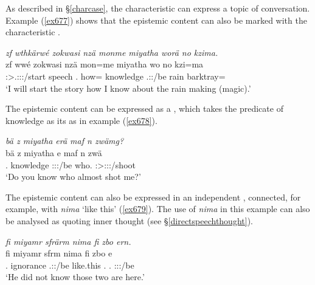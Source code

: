 As described in \S{}\ref{charcase}, the characteristic  can express a topic of conversation. Example (\ref{ex677}) shows that the epistemic content can also be marked with the characteristic .

\begin{exe}
	\ex \emph{zf wthkärwé zokwasi nzä monme miyatha worä no kzima.}\\
	\gll zf wwé zokwasi nzä mon=me miyatha wo no kzi=ma\\
	\Imm{} \Fsg:\Sbj>\Tsg.\F:\Obj:\Nonpast:\Ipfv/start speech \Fsg.\Abs{} how=\Ins{} knowledge \Fsg.\Sbj:\Nonpast:\Ipfv/be rain barktray=\Char{}\\
	\trans `I will start the story how I know about the rain making (magic).'\\
	\label{ex677}
\end{exe}

The epistemic content can be expressed as a , which takes the predicate of knowledge as its  as in example (\ref{ex678}).

\begin{exe}
	\ex \emph{bä z miyatha erä maf n zwämg?}\\
	\gll bä z miyatha e maf n zwä\\
	\Second.\Abs{} \Iam{} knowledge \Stpl:\Sbj:\Nonpast:\Ipfv/be who.\Erg{} \Imn{} \Stsg:\Sbj>\Fsg:\Obj:\Rpst:\Pfv/shoot\\
	\trans `Do you know who almost shot me?'
	\label{ex678}
\end{exe}

The epistemic content can also be expressed in an independent , connected, for example, with \emph{nima} `like this' (\ref{ex679}). The use of \emph{nima} in this example can also be analysed as quoting inner thought (see \S{}\ref{directspeechthought}).

\begin{exe}
	\ex \emph{fi miyamr sfrärm nima fi zbo ern.}\\
	\gll fi miyamr sfrm nima fi zbo e\\
	\Third.\Abs{} ignorance \Tsg.\Masc:\Sbj\Pst:\Dur/be {like.this} \Third.\Abs{} \Prox.\All{} \Stdu:\Sbj:\Nonpast:\Ipfv/be\\
	\trans `He did not know those two are here.'
	\label{ex679}
\end{exe}

